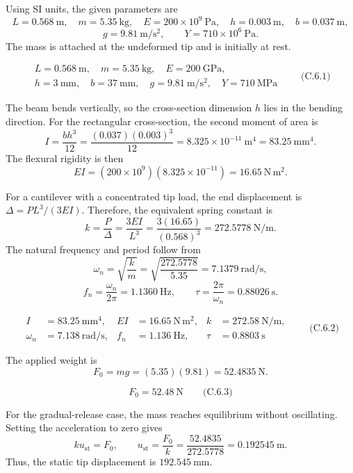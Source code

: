 Using SI units, the given parameters are
\[
L=0.568\ \mathrm{m},\quad m=5.35\ \mathrm{kg},\quad
E=200\times10^{9}\ \mathrm{Pa},\quad
h=0.003\ \mathrm{m},\quad b=0.037\ \mathrm{m},
\]
\[
g=9.81\ \mathrm{m/s^2},\qquad Y=710\times10^{6}\ \mathrm{Pa}.
\]
The mass is attached at the undeformed tip and is initially at rest.

\[
\boxed{\begin{gathered}
L=0.568\ \mathrm{m},\quad m=5.35\ \mathrm{kg},\quad E=200\ \mathrm{GPa},\\
h=3\ \mathrm{mm},\quad b=37\ \mathrm{mm},\quad
g=9.81\ \mathrm{m/s^2},\quad Y=710\ \mathrm{MPa}
\end{gathered}}
\qquad\text{(C.6.1)}
\]

The beam bends vertically, so the cross-section dimension \(h\) lies in the bending direction. For the rectangular cross-section, the second moment of area is
\[
I=\frac{bh^3}{12}
 =\frac{(0.037)(0.003)^3}{12}
 =8.325\times10^{-11}\ \mathrm{m^4}
 =83.25\ \mathrm{mm^4}.
\]
The flexural rigidity is then
\[
EI=(200\times10^9)(8.325\times10^{-11})
 =16.65\ \mathrm{N\,m^2}.
\]

For a cantilever with a concentrated tip load, the end displacement is \(\Delta=PL^3/(3EI)\). Therefore, the equivalent spring constant is
\[
k=\frac{P}{\Delta}=\frac{3EI}{L^3}
 =\frac{3(16.65)}{(0.568)^3}
 =272.5778\ \mathrm{N/m}.
\]
The natural frequency and period follow from
\[
\omega_n=\sqrt{\frac{k}{m}}
 =\sqrt{\frac{272.5778}{5.35}}
 =7.1379\ \mathrm{rad/s},
\]
\[
f_n=\frac{\omega_n}{2\pi}=1.1360\ \mathrm{Hz},
\qquad
\tau=\frac{2\pi}{\omega_n}=0.88026\ \mathrm{s}.
\]

\[
\boxed{\begin{aligned}
I&=83.25\ \mathrm{mm^4},&
EI&=16.65\ \mathrm{N\,m^2},&
k&=272.58\ \mathrm{N/m},\\
\omega_n&=7.138\ \mathrm{rad/s},&
f_n&=1.136\ \mathrm{Hz},&
\tau&=0.8803\ \mathrm{s}
\end{aligned}}
\qquad\text{(C.6.2)}
\]

The applied weight is
\[
F_0=mg=(5.35)(9.81)=52.4835\ \mathrm{N}.
\]

\[
\boxed{F_0=52.48\ \mathrm{N}}\qquad\text{(C.6.3)}
\]

For the gradual-release case, the mass reaches equilibrium without oscillating. Setting the acceleration to zero gives
\[
ku_{\mathrm{st}}=F_0,
\qquad
u_{\mathrm{st}}=\frac{F_0}{k}
 =\frac{52.4835}{272.5778}
 =0.192545\ \mathrm{m}.
\]
Thus, the static tip displacement is \(192.545\ \mathrm{mm}\).

